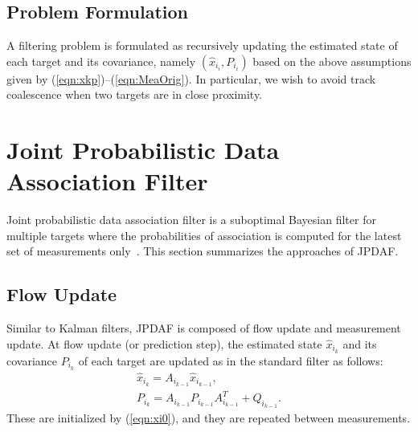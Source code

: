 \documentclass[letterpaper, 10pt, conference]{ieeeconf}
\newcommand{\refeqn}[1]{(\ref{eqn:#1})}
\begin{document}
\subsection{Problem Formulation}

A filtering problem is formulated as recursively updating the estimated state of each target and its covariance, namely $(\hat x_{i_i}, P_{i_i})$ based on the above assumptions given by \refeqn{xkp}--\refeqn{MeaOrig}. In particular, we wish to avoid track coalescence when two targets are in close proximity. 




		


\section{Joint Probabilistic Data Association Filter}
\label{JPDAF}

Joint probabilistic data association filter is a suboptimal Bayesian filter for multiple targets where the probabilities of association is computed for the latest set of measurements only~\cite{TrackDataAssoc}. This section summarizes the approaches of JPDAF. 

\subsection{Flow Update}
Similar to Kalman filters, JPDAF is composed of flow update and measurement update. At flow update (or prediction step), the estimated state $\hat x_{i_k}$ and its covariance $P_{i_k}$ of each target are updated as in the standard filter as follows:
\begin{gather}
\hat x_{i_{k}} = A_{i_{k-1}} \hat x_{i_{k-1}},\\
P_{i_{k}} = A_{i_{k-1}} P_{i_{k-1}} A_{i_{k-1}}^T + Q_{i_{k-1}}.
\end{gather}
These are initialized by \refeqn{xi0}, and they are repeated between measurements. 
\end{document}
